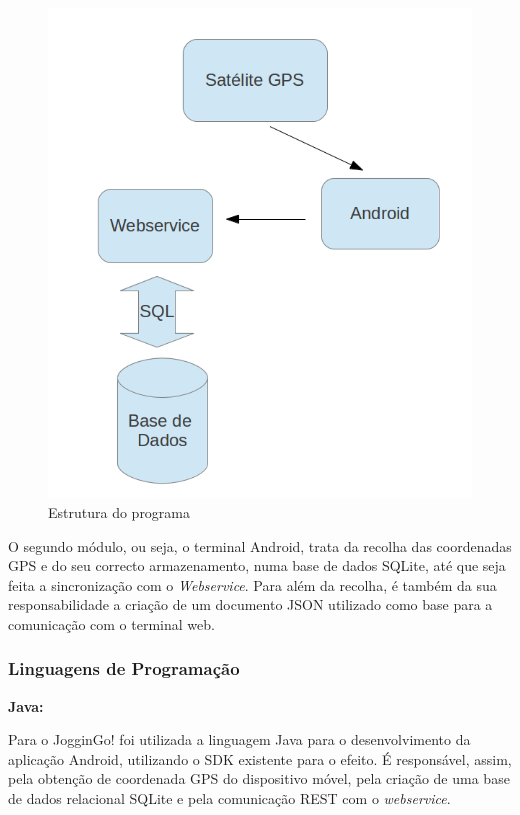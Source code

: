\documentclass[15pt,a4paper]{article}
\begin{document}
\begin{figure}[htp]
  \centering
  \includegraphics[scale=0.5]{diagrama.png}
  \caption{Estrutura do programa}
\end{figure}

O segundo módulo, ou seja, o terminal Android, trata da recolha das coordenadas GPS e do seu correcto armazenamento, numa base de dados SQLite, até que seja feita a sincronização com o \textit{Webservice}. Para além da recolha, é também da sua responsabilidade a criação de um documento JSON utilizado como base para a comunicação com o terminal web.


\subsubsection{Linguagens de Programação }


\textbf{Java:}

Para o JogginGo! foi utilizada a linguagem Java para o desenvolvimento da aplicação Android, utilizando o SDK existente para o efeito. É responsável, assim, pela obtenção de coordenada GPS do dispositivo móvel, pela criação de uma base de dados relacional SQLite e pela comunicação REST com o \textit{webservice}. 
\end{document}
